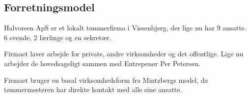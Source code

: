 \subsection{Forretningsmodel}

Halvorsen ApS er et lokalt tømmerfirma i Vissenbjerg, der lige nu har 9 ansatte. 6 svende, 2 lærlinge og en sekretær.

Firmaet laver arbejde for private, andre virksomheder og det offentlige.
Lige nu arbejder de hovedsageligt sammen med Entrepenør Per Petersen.

Firmaet bruger en basal virksomhedsform fra Mintzbergs model, da tømmermesteren har direkte kontakt med alle sine ansatte.

